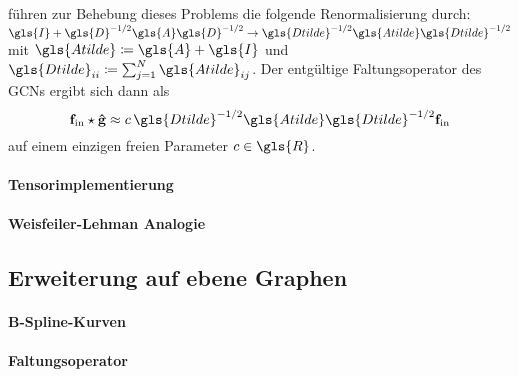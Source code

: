 \citeauthor{gcn} führen zur Behebung dieses Problems die folgende Renormalisierung durch: $\gls{I} + \gls{D}^{-1/2} \gls{A} \gls{D}^{-1/2} \rightarrow \gls{Dtilde}^{-1/2} \gls{Atilde} \gls{Dtilde}^{-1/2}$ mit $\gls{Atilde} \coloneqq \gls{A} + \gls{I}$ und $\gls{Dtilde}_{ii} \coloneqq \sum_{j=1}^N \gls{Atilde}_{ij}$.
Der entgültige Faltungsoperator des \glspl{GCN} ergibt sich dann als
\begin{equation*}
  \ve{f}_{\mathrm{in}} \star \ve{\hat g} \approx c\, \gls{Dtilde}^{-1/2} \gls{Atilde} \gls{Dtilde}^{-1/2} \ve{f}_{\mathrm{in}}
\end{equation*}
auf einem einzigen freien Parameter $c \in \gls{R}$.

\paragraph{Tensorimplementierung}
\label{gcn_tensor}

\paragraph{Weisfeiler-Lehman Analogie}
\label{weisfeiler_lehman_analogie}

\subsection{Erweiterung auf ebene Graphen}
\label{gcn_erweiterung}


\paragraph{B-Spline-Kurven}
\label{bspline}

\paragraph{Faltungsoperator}
\label{ebener_faltungsoperator}
